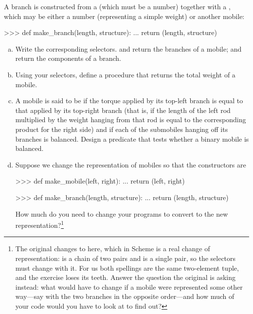 \begin{exerciseGroup}
A branch is constructed from a  (which must be a number) together
with a , which may be either a number (representing a simple
weight) or another mobile:

\begin{codeBlock}
>>> def make_branch(length, structure):
...     return (length, structure)
\end{codeBlock}

\begin{enumerate}[a.]

\item
Write the corresponding selectors.   and
 return the branches of a mobile;  and
 return the components of a branch.

\item
Using your selectors, define a procedure  that returns the
total weight of a mobile.

\item
A mobile is said to be  if the torque applied by its top-left
branch is equal to that applied by its top-right branch (that is, if the length
of the left rod multiplied by the weight hanging from that rod is equal to the
corresponding product for the right side) and if each of the submobiles hanging
off its branches is balanced.  Design a predicate  that
tests whether a binary mobile is balanced.

\item
Suppose we change the representation of mobiles so that the constructors are

\begin{codeBlock}
>>> def make_mobile(left, right):
...     return (left, right)

>>> def make_branch(length, structure):
...     return (length, structure)
\end{codeBlock}

How much do you need to change your programs to convert to the new
representation?\footnote{The original changes  to  here,
which in Scheme is a real change of representation:  is a
chain of two pairs and  is a single pair, so the selectors
must change with it.  For us both spellings are the same two-element tuple, and
the exercise loses its teeth.  Answer the question the original is asking
instead: what would have to change if a mobile were represented some other
way---say with the two branches in the opposite order---and how much of your
code would you have to look at to find out?}

\end{enumerate}
\end{exerciseGroup}

